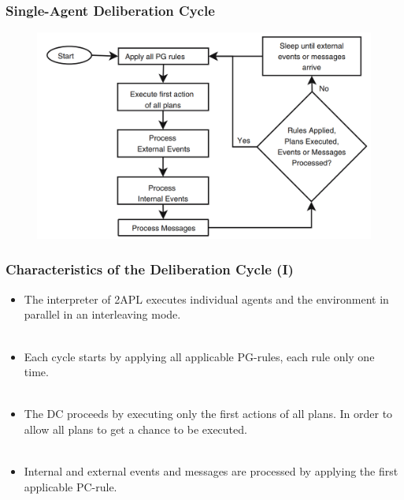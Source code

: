 \documentclass{beamer}
\begin{document}

\begin{frame}
	\frametitle{Single-Agent Deliberation Cycle}
    \begin{figure}
      \includegraphics[width=1\textwidth]{deliberation-cycle-individual-2apl}
    \end{figure}
\end{frame}


\begin{frame}
\frametitle{Characteristics of the Deliberation Cycle (I)}
  \begin{itemize}
  
      \item The interpreter of 2APL executes individual agents and the environment in
parallel in an interleaving mode.\\~\\
      
      \item Each cycle starts by applying all applicable PG-rules, each rule only one time. \\~\\
      
      \item The DC proceeds by executing only the first actions of all plans. In order to allow all plans to get a chance to be executed. \\~\\
      
      \item  Internal and external events and messages are processed by applying the first applicable PC-rule. \\~\\
      
  \end{itemize}
\end{frame}
\end{document}
